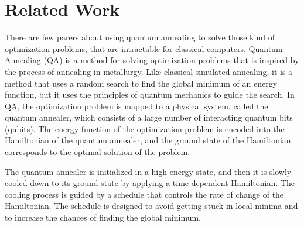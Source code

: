 \documentclass[12pt, a4paper]{article}
\begin{document}
    \section{Related Work}\label{sec:related-work}
    There are few parers about using quantum annealing to solve those kind of optimization problems, that are intractable
    for classical computers.
    Quantum Annealing (QA) is a method for solving optimization problems that is inspired by the process of annealing in
    metallurgy.
    Like classical simulated annealing, it is a method that uses a random search to find the global minimum
    of an energy function, but it uses the principles of quantum mechanics to guide the search.
    In QA, the optimization problem is mapped to a physical system, called the quantum annealer,
    which consists of a large number of interacting quantum bits (qubits).
    The energy function of the optimization problem is encoded into the Hamiltonian of the quantum annealer,
    and the ground state of the Hamiltonian corresponds to the optimal solution of the problem.

    The quantum annealer is initialized in a high-energy state,
    and then it is slowly cooled down to its ground state by applying a time-dependent Hamiltonian.
    The cooling process is guided by a schedule that controls the rate of change of the Hamiltonian.
    The schedule is designed to avoid getting stuck in local minima and to increase the chances of finding the global minimum.
\end{document}
